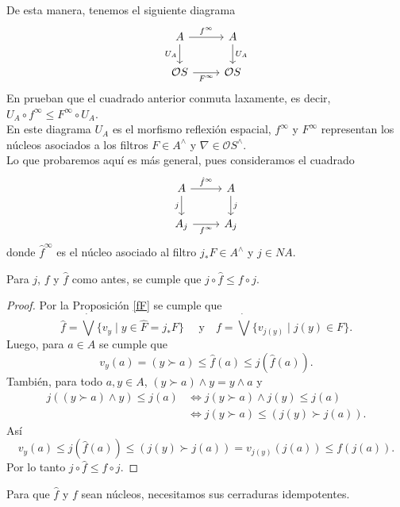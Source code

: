 De esta manera, tenemos el siguiente diagrama
\[\begin{tikzcd}
	A & A \\
	{\mathcal{O}S} & {\mathcal{O}S}
	\arrow["{f^\infty}", from=1-1, to=1-2]
	\arrow["{U_A}"', from=1-1, to=2-1]
	\arrow["{U_A}", from=1-2, to=2-2]
	\arrow["{F^\infty}"', from=2-1, to=2-2]
\end{tikzcd}\]
En \cite{H.S.V} prueban que el cuadrado anterior conmuta laxamente, es decir, $U_A\circ f^\infty\leq F^\infty \circ U_A$.\\

En este diagrama $U_A$ es el morfismo reflexión espacial, $f^\infty$ y $F^\infty$ representan los núcleos asociados a los filtros $F\in A^\wedge$ y $\nabla\in \mathcal{O}S^\wedge$.\\

Lo que probaremos aquí es más general, pues consideramos el cuadrado 
\[\begin{tikzcd}
	A & A \\
	{A_j} & {A_j}
	\arrow["{\hat{f}^\infty}", from=1-1, to=1-2]
	\arrow["j"', from=1-1, to=2-1]
	\arrow["j", from=1-2, to=2-2]
	\arrow["{f^\infty}"', from=2-1, to=2-2]
\end{tikzcd}
\]
donde $\hat{f}^\infty$ es el núcleo asociado al filtro $j_*F\in A^\wedge$ y $j\in NA$.  

\begin{lem}\label{f1f}
    Para $j$, $f$ y $\hat{f}$ como antes, se cumple que $j\circ \hat{f}\leq f\circ j$.
\end{lem}

\begin{proof}
    Por la Proposición \ref{fF} se cumple que
    \[
    \hat{f}=\dot{\bigvee}\{v_y\mid y\in \hat{F}=j_*F\}\quad  \mbox{ y} \quad f=\dot{\bigvee}\{v_{j(y)}\mid j(y)\in F\}. 
    \]
Luego, para $a\in A$ se cumple que
\[
v_y(a)=(y\succ a)\leq \hat{f}(a)\leq j(\hat{f}(a)).
\]
También, para todo $a,y\in A$, $(y\succ a)\wedge y=y\wedge a$ y
\[
\begin{split}
j((y\succ a)\wedge y)\leq j(a) & \Leftrightarrow j(y\succ a)\wedge j(y)\leq j(a)\\
& \Leftrightarrow j(y\succ a)\leq (j(y)\succ j(a)).
\end{split}
\]
Así
\[
v_y(a)\leq j(\hat{f}(a))\leq (j(y)\succ j(a))=v_{j(y)}(j(a))\leq f(j(a)).
\]
Por lo tanto $j\circ \hat{f}\leq f\circ j$.
\end{proof}

Para que $\hat{f}$ y $f$ sean núcleos, necesitamos sus cerraduras idempotentes.

